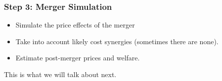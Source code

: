 \documentclass[aspectratio=169,10pt]{beamer}
\begin{document}
\begin{frame}
\frametitle{Step 3: Merger Simulation}
 \begin{itemize}
\item Simulate the price effects of the merger
\item Take into account likely cost synergies (sometimes there are none).
\item Estimate post-merger prices and welfare.
 \end{itemize}
 This is what we will talk about next.
\end{frame}
\end{document}

